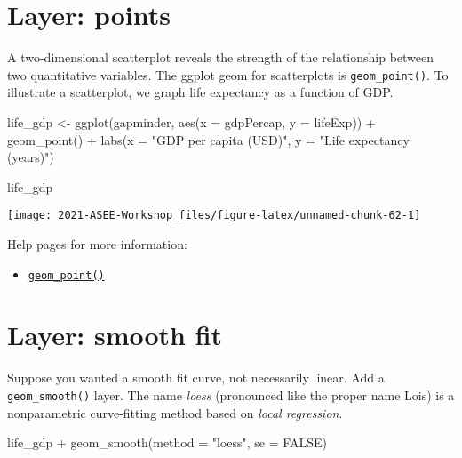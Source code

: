 \documentclass[
]{book}
\newenvironment{Shaded}{\begin{snugshade}}{\end{snugshade}}
\newcommand{\AttributeTok}[1]{\textcolor[rgb]{0.77,0.63,0.00}{#1}}
\newcommand{\ConstantTok}[1]{\textcolor[rgb]{0.00,0.00,0.00}{#1}}
\newcommand{\FunctionTok}[1]{\textcolor[rgb]{0.00,0.00,0.00}{#1}}
\newcommand{\NormalTok}[1]{#1}
\newcommand{\OtherTok}[1]{\textcolor[rgb]{0.56,0.35,0.01}{#1}}
\newcommand{\SpecialCharTok}[1]{\textcolor[rgb]{0.00,0.00,0.00}{#1}}
\newcommand{\StringTok}[1]{\textcolor[rgb]{0.31,0.60,0.02}{#1}}
\providecommand{\tightlist}{%
  \setlength{\itemsep}{0pt}\setlength{\parskip}{0pt}}
\begin{document}
\hypertarget{layer-points}{%
\section{Layer: points}\label{layer-points}}

A two-dimensional scatterplot reveals the strength of the relationship between two quantitative variables. The ggplot geom for scatterplots is \texttt{geom\_point()}. To illustrate a scatterplot, we graph life expectancy as a function of GDP.

\begin{Shaded}
\begin{Highlighting}[]
\NormalTok{life\_gdp }\OtherTok{\textless{}{-}} \FunctionTok{ggplot}\NormalTok{(gapminder, }\FunctionTok{aes}\NormalTok{(}\AttributeTok{x =}\NormalTok{ gdpPercap, }\AttributeTok{y =}\NormalTok{ lifeExp)) }\SpecialCharTok{+}
  \FunctionTok{geom\_point}\NormalTok{() }\SpecialCharTok{+}
  \FunctionTok{labs}\NormalTok{(}\AttributeTok{x =} \StringTok{"GDP per capita (USD)"}\NormalTok{, }\AttributeTok{y =} \StringTok{"Life expectancy (years)"}\NormalTok{)}

\NormalTok{life\_gdp}
\end{Highlighting}
\end{Shaded}

\texttt{[image: 2021-ASEE-Workshop\_files/figure-latex/unnamed-chunk-62-1]}

Help pages for more information:

\begin{itemize}
\tightlist
\item
  \href{https://ggplot2.tidyverse.org/reference/geom_point.html}{\texttt{geom\_point()}}
\end{itemize}

\hypertarget{layer-smooth-fit}{%
\section{Layer: smooth fit}\label{layer-smooth-fit}}

Suppose you wanted a smooth fit curve, not necessarily linear. Add a \texttt{geom\_smooth()} layer. The name \emph{loess} (pronounced like the proper name Lois) is a nonparametric curve-fitting method based on \emph{local regression}.

\begin{Shaded}
\begin{Highlighting}[]
\NormalTok{life\_gdp }\SpecialCharTok{+} 
  \FunctionTok{geom\_smooth}\NormalTok{(}\AttributeTok{method =} \StringTok{"loess"}\NormalTok{, }\AttributeTok{se =} \ConstantTok{FALSE}\NormalTok{)}
\end{Highlighting}
\end{Shaded}
\end{document}
